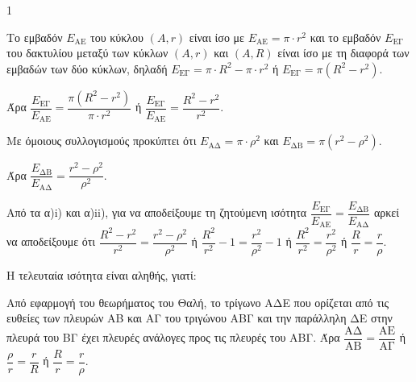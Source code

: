 \begin{ylh}{1}
    \item [ΛΥΣΗ]
\end{ylh}
\begin{alist}
    \item 
    \begin{rlist}
        \item Το εμβαδόν $E_{\text{ΑΕ}}$ του κύκλου $(A, r)$ είναι ίσο με $E_{\text{ΑΕ}} = \pi \cdot r^2$ και το εμβαδόν $E_{\text{ΕΓ}}$ του δακτυλίου μεταξύ των κύκλων $(A, r)$ και $(A, R)$ είναι ίσο με τη διαφορά των εμβαδών των δύο κύκλων, δηλαδή $E_{\text{ΕΓ}} = \pi \cdot R^2 - \pi \cdot r^2$ ή $E_{\text{ΕΓ}} = \pi(R^2 - r^2)$.

        Άρα $\dfrac{E_{\text{ΕΓ}}}{E_{\text{ΑΕ}}} = \dfrac{\pi(R^2 - r^2)}{\pi \cdot r^2}$ ή $\dfrac{E_{\text{ΕΓ}}}{E_{\text{ΑΕ}}} = \dfrac{R^2 - r^2}{r^2}$.

        \item Με όμοιους συλλογισμούς προκύπτει ότι $E_{\text{ΑΔ}} = \pi \cdot \rho^2$ και $E_{\text{ΔΒ}} = \pi(r^2 - \rho^2)$.

        Άρα $\dfrac{E_{\text{ΔΒ}}}{E_{\text{ΑΔ}}} = \dfrac{r^2 - \rho^2}{\rho^2}$.
    \end{rlist}

    \item Από τα α)i) και α)ii), για να αποδείξουμε τη ζητούμενη ισότητα $\dfrac{E_{\text{ΕΓ}}}{E_{\text{ΑΕ}}} = \dfrac{E_{\text{ΔΒ}}}{E_{\text{ΑΔ}}}$ αρκεί να αποδείξουμε ότι $\dfrac{R^2 - r^2}{r^2} = \dfrac{r^2 - \rho^2}{\rho^2}$ ή $\dfrac{R^2}{r^2} - 1 = \dfrac{r^2}{\rho^2} - 1$ ή $\dfrac{R^2}{r^2} = \dfrac{r^2}{\rho^2}$ ή $\dfrac{R}{r} = \dfrac{r}{\rho}$.

    Η τελευταία ισότητα είναι αληθής, γιατί:

    Από εφαρμογή του θεωρήματος του Θαλή, το τρίγωνο ΑΔΕ που ορίζεται από τις ευθείες των πλευρών ΑΒ και ΑΓ του τριγώνου ΑΒΓ και την παράλληλη ΔΕ στην πλευρά του ΒΓ έχει πλευρές ανάλογες προς τις πλευρές του ΑΒΓ. Άρα $\dfrac{\text{ΑΔ}}{\text{ΑΒ}} = \dfrac{\text{ΑΕ}}{\text{ΑΓ}}$ ή $\dfrac{\rho}{r} = \dfrac{r}{R}$ ή $\dfrac{R}{r} = \dfrac{r}{\rho}$.
\end{alist}